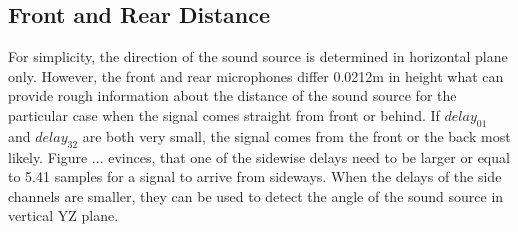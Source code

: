 \subsection{Front and Rear Distance}
\label{subsec:03_distance}


For simplicity, the direction of the sound source is determined in
horizontal plane only.
However, the front and rear microphones differ 0.0212\si{m} in height
what can provide rough information about the distance of the sound source
for the particular case when the signal comes straight from front or behind.
If $delay_{01}$ and $delay_{32}$ are both very small, the signal comes from
the front or the back most likely.
Figure ... evinces, that one of
the sidewise delays need to be larger or equal to 5.41 samples
 for a signal to arrive from sideways.
When the delays of the side channels are smaller, they can be used to
detect the angle of the sound source in vertical YZ plane.

